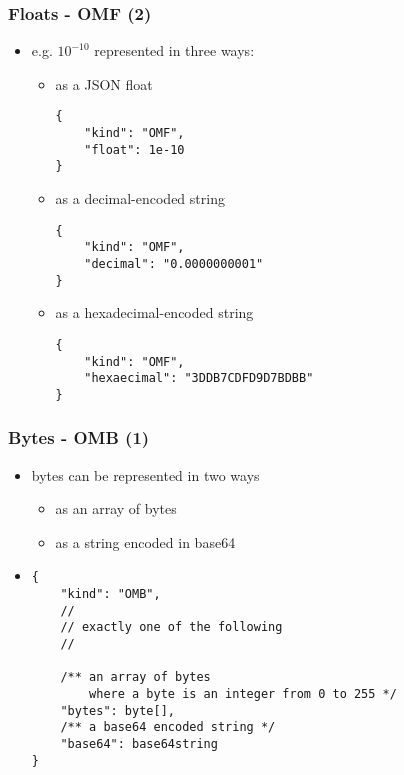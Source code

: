 \documentclass[usenames,dvipsnames]{beamer}
\begin{document}
\begin{frame}[fragile]
    \frametitle{Floats - OMF (2)}
    \begin{itemize}
    \item e.g. $10^{-10}$ represented in three ways:
    \begin{itemize}
        \item as a JSON float
\begin{lstlisting}
{
    "kind": "OMF",
    "float": 1e-10
}
\end{lstlisting}
        \item as a decimal-encoded string
\begin{lstlisting}
{
    "kind": "OMF",
    "decimal": "0.0000000001"
}
\end{lstlisting}
        \item as a hexadecimal-encoded string
\begin{lstlisting}
{
    "kind": "OMF",
    "hexaecimal": "3DDB7CDFD9D7BDBB"
}
\end{lstlisting}
        \end{itemize}
    \end{itemize}
\end{frame}

\begin{frame}[fragile]
    \frametitle{Bytes - OMB (1)}
    \begin{itemize}
        \item bytes can be represented in two ways
        \begin{itemize}
            \item as an array of bytes
            \item as a string encoded in base64
        \end{itemize}
        \item
\begin{lstlisting}
{
    "kind": "OMB",
    //
    // exactly one of the following
    //

    /** an array of bytes
        where a byte is an integer from 0 to 255 */
    "bytes": byte[],
    /** a base64 encoded string */
    "base64": base64string
}
\end{lstlisting}
    \end{itemize}
\end{frame}
\end{document}
